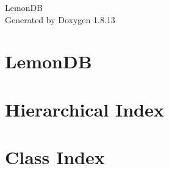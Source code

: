 \documentclass[twoside]{book}
\newcommand{\+}{\discretionary{\mbox{\scriptsize$\hookleftarrow$}}{}{}}
\newcommand{\clearemptydoublepage}{%
  \newpage{\pagestyle{empty}\cleardoublepage}%
}
\begin{document}
\hypersetup{pageanchor=false,
             bookmarksnumbered=true,
             pdfencoding=unicode
            }
\begin{titlepage}
\vspace*{7cm}
\begin{center}%
{\Large Lemon\+DB }\\
\vspace*{1cm}
{\large Generated by Doxygen 1.8.13}\\
\end{center}
\end{titlepage}
\clearemptydoublepage
{}
\tableofcontents
\clearemptydoublepage
{}
\hypersetup{pageanchor=true}

\chapter{Lemon\+DB}
\label{index}\hypertarget{index}{}
\chapter{Hierarchical Index}

\chapter{Class Index}

\end{document}

